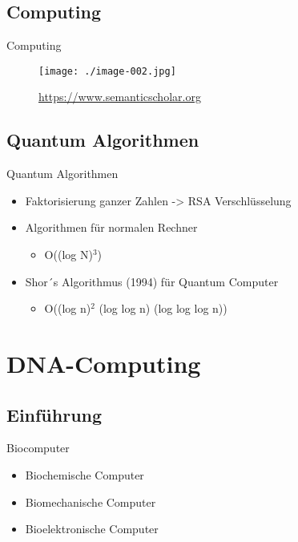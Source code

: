 \documentclass[aspectratio=1610]{beamer}
\begin{document}
\subsection{Computing}
\label{sec:orgfd4c051}

\begin{frame}[label={sec:org4e77e77}]{Computing}
\begin{figure}[htbp]
\centering
\texttt{[image: ./image-002.jpg]}
\caption{\url{https://www.semanticscholar.org}}
\end{figure}
\end{frame}

\subsection{Quantum Algorithmen}
\label{sec:org8e87eb7}
\begin{frame}[label={sec:org2bbb0c8}]{Quantum Algorithmen}
\begin{itemize}
\item Faktorisierung ganzer Zahlen -> RSA Verschlüsselung
\item Algorithmen für normalen Rechner
\begin{itemize}
\item O((log N)\(^{\text{3}}\))
\end{itemize}
\item Shor´s Algorithmus (1994) für Quantum Computer
\begin{itemize}
\item O((log n)\(^{\text{2}}\) (log log n) (log log log n))
\end{itemize}
\end{itemize}
\end{frame}

\section{DNA-Computing}
\label{sec:orge9ae4bd}

\subsection{Einführung}
\label{sec:org6ce5334}
\begin{frame}[label={sec:org5b9834d}]{Biocomputer}
\begin{itemize}
\item Biochemische Computer
\item Biomechanische Computer
\item Bioelektronische Computer
\end{itemize}
\end{frame}
\end{document}
